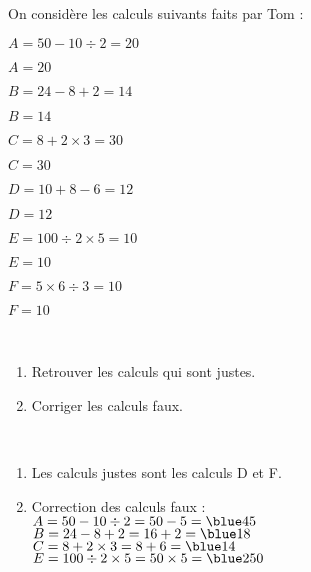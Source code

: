 \begin{exercice} %
   On considère les calculs suivants faits par Tom :
   \setlength{\columnseprule}{0pt}
   \begin{multicols}{2}
      \begin{list}{}{}
         \item $A=50-10\div2 =20$
         \item $A=20$
         \item 
         \item $B=24-8+2 =14$
         \item $B=14$
         \item 
         \item $C=8+2\times3 =30$
         \item $C=30$
         \columnbreak
         \item $D=10+8-6 =12$
         \item $D=12$
         \item 
         \item $E=100\div2\times5 =10$
         \item $E=10$
         \item 
         \item $F=5\times6\div3 =10$
         \item $F=10$
      \end{list}
   \end{multicols}
   \  \\ [-10mm]
   \begin{enumerate}
      \item Retrouver les calculs qui sont justes.
      \item Corriger les calculs faux.
   \end{enumerate}
\end{exercice}

\begin{corrige}
   \ \\ [-5mm]
   \begin{enumerate}
      \item Les calculs justes sont les calculs {\blue D} et {\blue F}. \smallskip
      \item Correction des calculs faux : \\
         $A=50-10\div2 =50-5 ={\blue 45}$ \\ [1mm]
         $B=24-8+2 =16+2 ={\blue 18}$ \\ [1mm]
         $C=8+2\times3 =8+6 ={\blue 14}$ \\ [1mm]
         $E=100\div2\times5 =50\times5 = {\blue 250}$
   \end{enumerate}
\end{corrige}